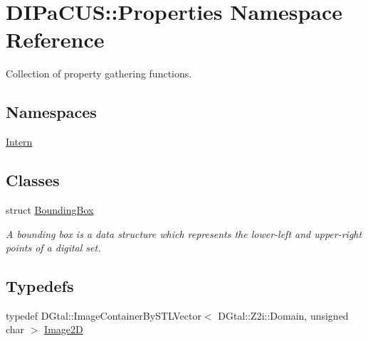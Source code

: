 \hypertarget{namespaceDIPaCUS_1_1Properties}{}\section{D\+I\+Pa\+C\+US\+:\+:Properties Namespace Reference}
\label{namespaceDIPaCUS_1_1Properties}


Collection of property gathering functions.  


\subsection*{Namespaces}
\begin{DoxyCompactItemize}
\item 
 \hyperlink{namespaceDIPaCUS_1_1Properties_1_1Intern}{Intern}
\end{DoxyCompactItemize}
\subsection*{Classes}
\begin{DoxyCompactItemize}
\item 
struct \hyperlink{structDIPaCUS_1_1Properties_1_1BoundingBox}{Bounding\+Box}
\begin{DoxyCompactList}\small\item\em A bounding box is a data structure which represents the lower-\/left and upper-\/right points of a digital set. \end{DoxyCompactList}\end{DoxyCompactItemize}
\subsection*{Typedefs}
\begin{DoxyCompactItemize}
\item 
typedef D\+Gtal\+::\+Image\+Container\+By\+S\+T\+L\+Vector$<$ D\+Gtal\+::\+Z2i\+::\+Domain, unsigned char $>$ \hyperlink{namespaceDIPaCUS_1_1Properties_aa6a61f89ec9c6c464ab0c0755f92e7fc}{Image2D}
\end{DoxyCompactItemize}
